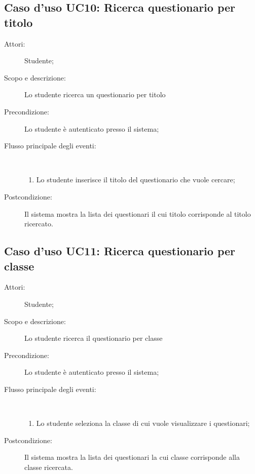 \subsection{Caso d'uso UC10: Ricerca questionario per titolo}\begin{description}
	\item[Attori:] Studente;
	\item[Scopo e descrizione:] Lo studente ricerca un questionario per titolo
	\item[Precondizione:] Lo studente è autenticato presso il sistema;
	
	\item[Flusso principale degli eventi:] \ 
	\begin{enumerate}
		\item Lo studente inserisce il titolo del questionario che vuole cercare;
		
	\end{enumerate}
	\item[Postcondizione:] Il sistema mostra la lista dei questionari il cui titolo corrisponde al titolo ricercato.
\end{description}
\hypertarget{UC11}{}
\subsection{Caso d'uso UC11: Ricerca questionario per classe}\begin{description}
	\item[Attori:] Studente;
	\item[Scopo e descrizione:] Lo studente ricerca il questionario per classe
	\item[Precondizione:] Lo studente è autenticato presso il sistema;
	
	\item[Flusso principale degli eventi:] \ 
	\begin{enumerate}
		\item Lo studente seleziona la classe di cui vuole visualizzare i questionari;
		
	\end{enumerate}
	\item[Postcondizione:] Il sistema mostra la lista dei questionari la cui classe corrisponde alla classe ricercata.
\end{description}
\hypertarget{UC12}{}
